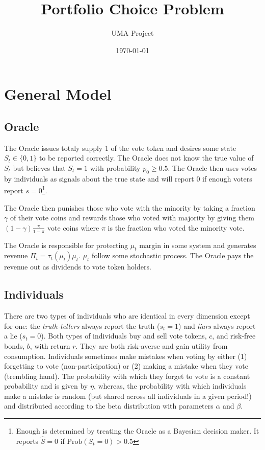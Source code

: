\documentclass[12pt]{article}
\title{Portfolio Choice Problem}
\author{UMA Project}
\date{\today}
\begin{document}
\maketitle


\section{General Model}


\subsection{Oracle}

  The Oracle issues totaly supply 1 of the vote token and desires some state $S_t \in \{0, 1\}$ to
  be reported correctly. The Oracle does not know the true value of $S_t$ but believes that
  $S_t = 1$ with probability $p_0 \geq 0.5$. The Oracle then uses votes by individuals as signals
  about the true state and will report $0$ if enough voters report $s = 0$\footnote{Enough is
  determined by treating the Oracle as a Bayesian decision maker. It reports $\hat{S} = 0$ if
  $\text{Prob}(S_t = 0) > 0.5$}.

  The Oracle then punishes those who vote with the minority by taking a fraction $\gamma$ of their
  vote coins and rewards those who voted with majority by giving them $(1 - \gamma) \frac{\pi}{1 -
  \pi}$ vote coins where $\pi$ is the fraction who voted the minority vote.

  The Oracle is responsible for protecting $\mu_t$ margin in some system and generates revenue
  $\Pi_t = \tau_t(\mu_t) \mu_t$. $\mu_t$ follow some stochastic process. The Oracle pays the revenue
  out as dividends to vote token holders.


\subsection{Individuals}

  There are two types of individuals who are identical in every dimension except for one: the
  \textit{truth-tellers} always report the truth ($s_t = 1$) and \textit{liars} always report a lie
  ($s_t = 0$). Both types of individuals buy and sell vote tokens, $c$, and risk-free bonds, $b$,
  with return $r$. They are both risk-averse and gain utility from consumption. Individuals
  sometimes make mistakes when voting by either (1) forgetting to vote (non-participation) or (2)
  making a mistake when they vote (trembling hand). The probability with which they forget to vote
  is a constant probability and is given by $\eta$, whereas, the probability with which individuals
  make a mistake is random (but shared across all individuals in a given period!) and distributed
  according to the beta distribution with parameters $\alpha$ and $\beta$.
\end{document}
